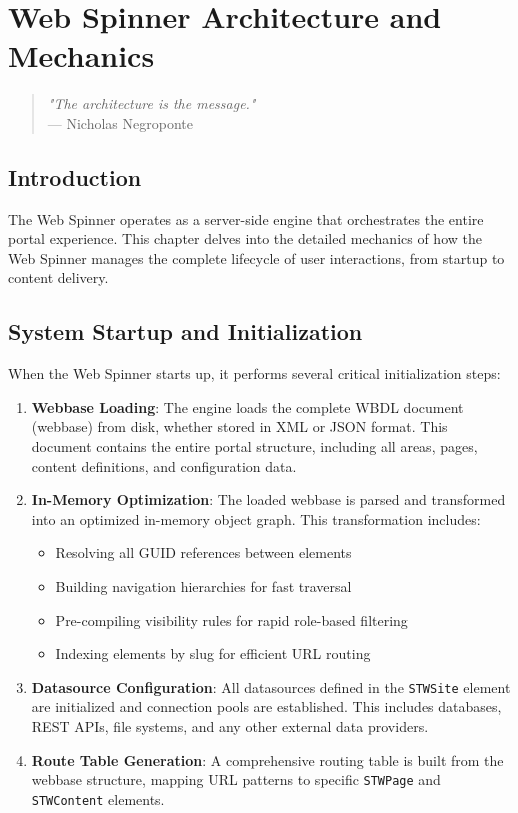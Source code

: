 \chapter{Web Spinner Architecture and Mechanics}
\label{chap:spinner-architecture}

\begin{quote}
\textit{"The architecture is the message."} \\
— Nicholas Negroponte
\end{quote}

\section{Introduction}

The Web Spinner operates as a server-side engine that orchestrates the entire portal experience. This chapter delves into the detailed mechanics of how the Web Spinner manages the complete lifecycle of user interactions, from startup to content delivery.

\section{System Startup and Initialization}

When the Web Spinner starts up, it performs several critical initialization steps:

\begin{enumerate}
\item \textbf{Webbase Loading}: The engine loads the complete WBDL document (webbase) from disk, whether stored in XML or JSON format. This document contains the entire portal structure, including all areas, pages, content definitions, and configuration data.

\item \textbf{In-Memory Optimization}: The loaded webbase is parsed and transformed into an optimized in-memory object graph. This transformation includes:
\begin{itemize}
\item Resolving all GUID references between elements
\item Building navigation hierarchies for fast traversal
\item Pre-compiling visibility rules for rapid role-based filtering
\item Indexing elements by slug for efficient URL routing
\end{itemize}

\item \textbf{Datasource Configuration}: All datasources defined in the \texttt{STWSite} element are initialized and connection pools are established. This includes databases, REST APIs, file systems, and any other external data providers.

\item \textbf{Route Table Generation}: A comprehensive routing table is built from the webbase structure, mapping URL patterns to specific \texttt{STWPage} and \texttt{STWContent} elements.
\end{enumerate}

